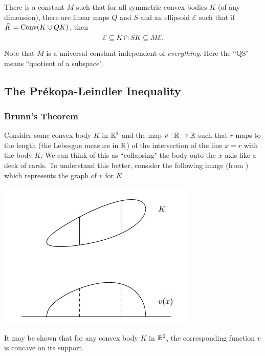 \begin{ftheo}[QS-Theorem]
There is a constant $M$ such that for all symmetric convex bodies $K$ (of any dimension), there are linear maps $Q$ and $S$ and an ellipsoid $\mathcal{E}$ such that if $\tilde K = \operatorname{Conv}(K\cup Q K)$, then
\[ \mathcal{E} \subseteq \tilde K \cap S \tilde K \subseteq M\mathcal{E}. \]
\end{ftheo}

Note that $M$ is a universal constant independent of \textit{everything}. Here the ``QS" means ``quotient of a subspace".

\clearpage
\subsection{The Pr\'{e}kopa-Leindler Inequality}

\subsubsection{Brunn's Theorem}

Consider some convex body $K$ in $\mathbb{R}^2$ and the map $v:\mathbb{R}\to\mathbb{R}$ such that $r$ maps to the length (the Lebesgue measure in $\mathbb{R}$) of the intersection of the line $x=r$ with the body $K$. We can think of this as ``collapsing" the body onto the $x$-axis like a deck of cards. To understand this better, consider the following image (from \cite{intro-ball}) which represents the graph of $v$ for $K$.

\begin{center}
    \includegraphics{brunn-shakedown.jpg}
\end{center}

It may be shown that for any convex body $K$ in $\mathbb{R}^2$, the corresponding function $v$ is concave on its support.\\

